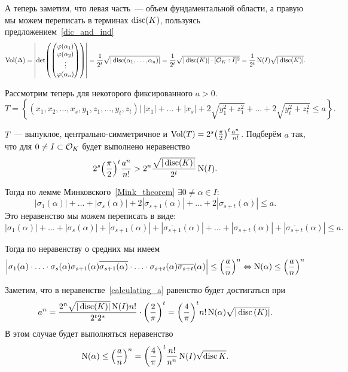 	А теперь заметим, что левая часть~--- объем фундаментальной области, а правую мы можем переписать в терминах $\disc(K)$, пользуясь предложением~\ref{dic_and_ind}
	\[
		\Vol(\Delta) = \left\lvert \det\lr*{\begin{pmatrix} \varphi(\alpha_1) \\ \varphi(\alpha_2) \\ \vdots \\ \varphi(\alpha_n) \end{pmatrix}} \right\rvert
 = \frac{1}{2^t} \sqrt{|\disc(\alpha_1, \ldots, \alpha_n)|} = \frac{1}{2^t} \sqrt{|\disc(K)| \cdot [\cO_{K} : I]^2} = \frac{1}{2^t} \Nm(I) \sqrt{|\disc(K)|}.	
 	\]

 	Рассмотрим теперь для некоторого фиксированного $a > 0$.
 	\[
 		T = \left\{ (x_1, x_2, \ldots, x_{s}, y_{1}, z_{1}, \ldots, y_{t}, z_{t})\vert \ |x_1| + \ldots + |x_s| + 2\sqrt{y_1^2 + z_1^2} + \ldots + 2\sqrt{y_t^2 + z_t^2} \le a \right\}. 
 	\]

 	$T$~--- выпуклое, центрально-симметричное и $\Vol(T) = 2^s \lr*{\frac{\pi}{2}}^t \frac{a^n}{n!}$.
 	Подберём $a$ так, что для $0 \neq I \subset \cO_{K}$ будет выполнено неравенство 
 	\begin{equation}
 		2^s \lr*{\frac{\pi}{2}}^t \frac{a^n}{n!} > 2^n \frac{\sqrt{|\disc(K)|}}{2^t} \Nm(I). \label{calculating_a}
 	\end{equation}

 	Тогда по лемме Минковского~\ref{Mink_theorem} $\exists 0 \neq \alpha \in I\colon$
 	\[
 	 	|\sigma_1(\alpha)| + \ldots + |\sigma_{s}(\alpha)| + 2 |\sigma_{s + 1}(\alpha)| + \ldots +  2|\sigma_{s + t}(\alpha)| \le a.
 	 \] 
 	 Это неравенство мы можем переписать в виде: 
 	 \[
 	 	|\sigma_1(\alpha)| + \ldots + |\sigma_{s}(\alpha)| + |\sigma_{s + 1}(\alpha)| + |\overline{\sigma_{s + 1}}(\alpha)| + \ldots +  |\sigma_{s + t}(\alpha)| + |\overline{\sigma_{s + t}}(\alpha)| \le a.
 	 \]

 	  Тогда по неравенству о средних мы имеем 
 	  \[
 	  	\left\lvert \sigma_{1}(\alpha) \cdot \ldots \cdot \sigma_{s}(\alpha) \sigma_{s + 1}(\alpha) \overline{\sigma_{s + 1}(\alpha)} \cdot \ldots \cdot \sigma_{s + t}(\alpha) \overline{\sigma_{s + t}}(\alpha) \right\rvert \le \lr*{\frac{a}{n}}^n \Leftrightarrow \Nm(\alpha) \le \lr*{\frac{a}{n}}^n
 	  \]

 	  Заметим, что в неравенстве~\eqref{calculating_a} равенство будет достигаться при 
 	  \[
 	  	a^n = \frac{2^n \sqrt{|\disc(K)|} \Nm(I) n!}{2^t 2^s} \cdot \lr*{\frac{2}{\pi}}^t = \lr*{\frac{4}{\pi}}^{t} n! \Nm(\alpha) \sqrt{|\disc{(K)}|}.
 	  \]
 	  В этом случае будет выполняться неравенство
 	  \[
 	  		\Nm(\alpha) \le \lr*{\frac{a}{n}}^n = \lr*{\frac{4}{\pi}}^t \frac{n!}{n^n} \Nm(I) \sqrt{\disc{K}}.
 	  \]

